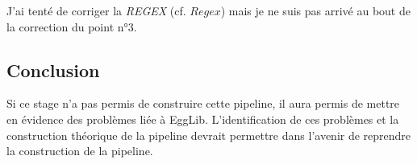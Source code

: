 \documentclass[../main]{subfiles} %
\begin{document}
J'ai tenté de corriger la \textit{REGEX} (cf. \cite{florent_f-marchalm1bioinfointernship2024-inrae_agap_ge2pop_2024} $Regex$) mais je ne suis pas arrivé au bout de la correction du point n°3. 

\subsection{Conclusion}
\label{sec:EggConclusion}
Si ce stage n'a pas permis de construire cette pipeline, il aura permis de mettre en évidence des problèmes liée à \gls{EggLib}. L'identification de ces problèmes et la construction théorique de la pipeline devrait permettre dans l'avenir de reprendre la construction de la pipeline.
\end{document}
